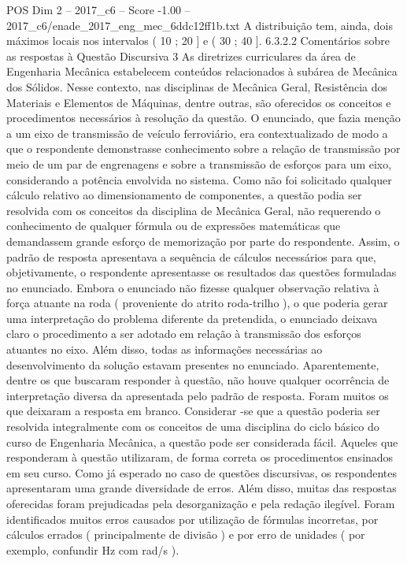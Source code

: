 \begin{textsample}{POS Dim 2 – 2017\_c6 – Score -1.00 – 2017\_c6/enade\_2017\_eng\_mec\_6ddc12ff1b.txt}
A distribuição tem, ainda, dois máximos locais nos intervalos ( 10 ; 20 ] e ( 30 ; 40 ]. 6.3.2.2 Comentários sobre as respostas à Questão Discursiva 3 As diretrizes curriculares da área de Engenharia Mecânica estabelecem conteúdos relacionados à subárea de Mecânica dos Sólidos.
Nesse contexto, nas disciplinas de Mecânica Geral, Resistência dos Materiais e Elementos de Máquinas, dentre outras, são oferecidos os conceitos e procedimentos necessários à resolução da questão.
O enunciado, que fazia menção a um eixo de transmissão de veículo ferroviário, era contextualizado de modo a que o respondente demonstrasse conhecimento sobre a relação de transmissão por meio de um par de engrenagens e sobre a transmissão de esforços para um eixo, considerando a potência envolvida no sistema.
Como não foi solicitado qualquer cálculo relativo ao dimensionamento de componentes, a questão podia ser resolvida com os conceitos da disciplina de Mecânica Geral, não requerendo o conhecimento de qualquer fórmula ou de expressões matemáticas que demandassem grande esforço de memorização por parte do respondente.
Assim, o padrão de resposta apresentava a sequência de cálculos necessários para que, objetivamente, o respondente apresentasse os resultados das questões formuladas no enunciado.
Embora o enunciado não fizesse qualquer observação relativa à força atuante na roda ( proveniente do atrito roda-trilho ), o que poderia gerar uma interpretação do problema diferente da pretendida, o enunciado deixava claro o procedimento a ser adotado em relação à transmissão dos esforços atuantes no eixo.
Além disso, todas as informações necessárias ao desenvolvimento da solução estavam presentes no enunciado.
Aparentemente, dentre os que buscaram responder à questão, não houve qualquer ocorrência de interpretação diversa da apresentada pelo padrão de resposta.
Foram muitos os que deixaram a resposta em branco.
Considerar -se que a questão poderia ser resolvida integralmente com os conceitos de uma disciplina do ciclo básico do curso de Engenharia Mecânica, a questão pode ser considerada fácil.
Aqueles que responderam à questão utilizaram, de forma correta os procedimentos ensinados em seu curso.
Como já esperado no caso de questões discursivas, os respondentes apresentaram uma grande diversidade de erros.
Além disso, muitas das respostas oferecidas foram prejudicadas pela desorganização e pela redação ilegível.
Foram identificados muitos erros causados por utilização de fórmulas incorretas, por cálculos errados ( principalmente de divisão ) e por erro de unidades ( por exemplo, confundir Hz com rad/s ).

\end{textsample}
